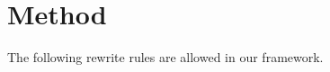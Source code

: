 \documentclass[usenames,dvipsnames]{article} %
\begin{document}



  \section{Method}\label{sec:method}

  The following rewrite rules are allowed in our framework.
\end{document}

